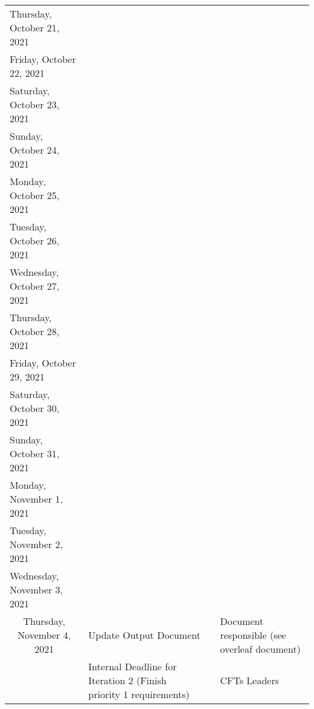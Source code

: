 \begin{adjustbox}{width=1.2\textwidth}
\begin{tabular}{|l|l|l|l|}
Thursday, October 21, 2021 &               \multicolumn{ 3}{|c}{} \\

Friday, October 22, 2021 &               \multicolumn{ 3}{|c}{} \\

Saturday, October 23, 2021 &               \multicolumn{ 3}{|c}{} \\

Sunday, October 24, 2021 &               \multicolumn{ 3}{|c}{} \\

Monday, October 25, 2021 &               \multicolumn{ 3}{|c}{} \\

Tuesday, October 26, 2021 &               \multicolumn{ 3}{|c}{} \\

Wednesday, October 27, 2021 &               \multicolumn{ 3}{|c}{} \\

Thursday, October 28, 2021 &               \multicolumn{ 3}{|c}{} \\

Friday, October 29, 2021 &               \multicolumn{ 3}{|c}{} \\

Saturday, October 30, 2021 &               \multicolumn{ 3}{|c}{} \\

Sunday, October 31, 2021 &               \multicolumn{ 3}{|c}{} \\
\hline
Monday, November 1, 2021 &            &            &            \\
\hline
Tuesday, November 2, 2021 &            &            &            \\
\hline
Wednesday, November 3, 2021 &            &            &            \\
\hline
\multicolumn{ 1}{|c|}{Thursday, November 4, 2021} & Update Output Document  &            & Document responsible (see overleaf document) \\

\multicolumn{ 1}{|c|}{} & Internal Deadline for Iteration 2 (Finish priority 1 requirements) &            & CFTs Leaders \\


\end{tabular}
\end{adjustbox}

